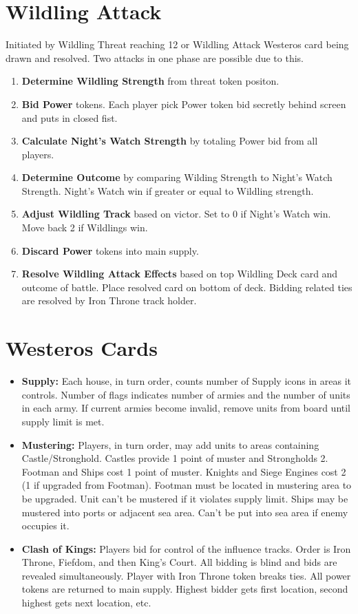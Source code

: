\documentclass[12pt]{article}
\newenvironment{enumerateCustom}
{\begin{enumerate}
  \setlength{\itemsep}{1pt}
  \setlength{\parskip}{0pt}
  \setlength{\parsep}{0pt}}
{\end{enumerate}}
\newenvironment{itemizeCustom}
{\begin{itemize}
  \setlength{\itemsep}{1pt}
  \setlength{\parskip}{0pt}
  \setlength{\parsep}{0pt}}
{\end{itemize}}
\begin{document}
\begin{multicols*}{2}
\section*{Wildling Attack}
Initiated by Wildling Threat reaching 12 or Wildling Attack Westeros card being drawn and resolved. Two attacks in one phase are possible due to this.
\begin{enumerateCustom}
	\item \textbf{Determine Wildling Strength} from threat token positon.
	\item \textbf{Bid Power} tokens. Each player pick Power token bid secretly behind screen and puts in closed fist.
	\item \textbf{Calculate Night's Watch Strength} by totaling Power bid from all players.
	\item \textbf{Determine Outcome} by comparing Wilding Strength to Night's Watch Strength. Night's Watch win if greater or equal to Wildling strength.
	\item \textbf{Adjust Wildling Track} based on victor. Set to 0 if Night's Watch win. Move back 2 if Wildlings win.
	\item \textbf{Discard Power} tokens into main supply.
	\item \textbf{Resolve Wildling Attack Effects} based on top Wildling Deck card and outcome of battle. Place resolved card on bottom of deck. Bidding related ties are resolved by Iron Throne track holder.
\end{enumerateCustom}

\section*{Westeros Cards}
\begin{itemizeCustom}
	\item \textbf{Supply:} Each house, in turn order, counts number of Supply icons in areas it controls. Number of flags indicates number of armies and the number of units in each army. If current armies become invalid, remove units from board until supply limit is met.
	\item \textbf{Mustering:} Players, in turn order, may add units to areas containing Castle/Stronghold. Castles provide 1 point of muster and Strongholds 2. Footman and Ships cost 1 point of muster. Knights and Siege Engines cost 2 (1 if upgraded from Footman). Footman must be located in mustering area to be upgraded. Unit can't be mustered if it violates supply limit. Ships may be mustered into ports or adjacent sea area. Can't be put into sea area if enemy occupies it.
	\item \textbf{Clash of Kings:} Players bid for control of the influence tracks. Order is Iron Throne, Fiefdom, and then King's Court. All bidding is blind and bids are revealed simultaneously. Player with Iron Throne token breaks ties. All power tokens are returned to main supply. Highest bidder gets first location, second highest gets next location, etc.
\end{itemizeCustom}


\end{multicols*}
\end{document}
